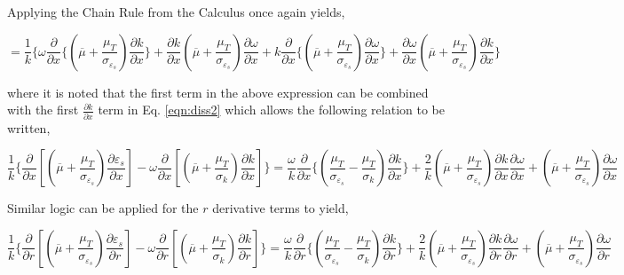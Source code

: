 	Applying the Chain Rule from the Calculus once again yields,

\begin{displaymath}
	= \frac{1}{k}\Bigg\{ \omega \frac{\partial}{\partial x}\Big\{(\overline{\mu} + \frac{\mu_T}{\sigma_{\varepsilon_s}})
	\frac{\partial k}{\partial x}\Big\} + \frac{\partial k}{\partial x}(\overline{\mu} + \frac{\mu_T}{\sigma_{\varepsilon_s}})
	\frac{\partial \omega}{\partial x} + k \frac{\partial}{\partial x}\Big\{(\overline{\mu} + 
	\frac{\mu_T}{\sigma_{\varepsilon_s}})\frac{\partial \omega}{\partial x}\Big\} + \frac{\partial \omega}{\partial x}
	(\overline{\mu} + \frac{\mu_T}{\sigma_{\varepsilon_s}})\frac{\partial k}{\partial x} \Bigg\}
\end{displaymath}

	where it is noted that the first term in the above expression can be combined with the first 
$\frac{\partial k}{\partial x}$ term in Eq. \ref{eqn:diss2} which allows the following relation to be written,

\begin{equation}
	\frac{1}{k}\Big\{\frac{\partial}{\partial x}[(\overline{\mu} + \frac{\mu_T}{\sigma_{\varepsilon_s}})
	\frac{\partial \varepsilon_s}{\partial x}] - \omega \frac{\partial}{\partial x}[(\overline{\mu} + \frac{\mu_T}{\sigma_k})
	\frac{\partial k}{\partial x}]\Big\} = \frac{\omega}{k}\frac{\partial}{\partial x}
	\Big\{(\frac{\mu_T}{\sigma_{\varepsilon_s}} 
	-\frac{\mu_T}{\sigma_k})\frac{\partial k}{\partial x}\Big\} + \frac{2}{k}(\overline{\mu} 
	+ \frac{\mu_T}{\sigma_{\varepsilon_s}})\frac{\partial k}{\partial x}\frac{\partial \omega}{\partial x}
	+ (\overline{\mu} + \frac{\mu_T}{\sigma_{\varepsilon_s}})\frac{\partial \omega}{\partial x}
\label{eqn:simpx}
\end{equation}

	Similar logic can be applied for the $r$ derivative terms to yield,

\begin{equation}
	\frac{1}{k}\Big\{\frac{\partial}{\partial r}[(\overline{\mu} + \frac{\mu_T}{\sigma_{\varepsilon_s}})
	\frac{\partial \varepsilon_s}{\partial r}] - \omega \frac{\partial}{\partial r}[(\overline{\mu} + \frac{\mu_T}{\sigma_k})
	\frac{\partial k}{\partial r}]\Big\} = \frac{\omega}{k}\frac{\partial}{\partial r}
	\Big\{(\frac{\mu_T}{\sigma_{\varepsilon_s}} 
	-\frac{\mu_T}{\sigma_k})\frac{\partial k}{\partial r}\Big\} + \frac{2}{k}(\overline{\mu} 
	+ \frac{\mu_T}{\sigma_{\varepsilon_s}})\frac{\partial k}{\partial r}\frac{\partial \omega}{\partial r}
	+ (\overline{\mu} + \frac{\mu_T}{\sigma_{\varepsilon_s}})\frac{\partial \omega}{\partial r}
\label{eqn:simpr}
\end{equation}

